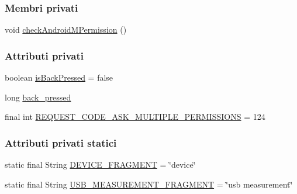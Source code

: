 \subsubsection*{Membri privati}
\begin{DoxyCompactItemize}
\item 
void \hyperlink{classit_1_1unibo_1_1torsello_1_1bluetoothpositioning_1_1activities_1_1MainActivity_ab762aac3d11f5b0ccc6042a140804d5d_ab762aac3d11f5b0ccc6042a140804d5d}{check\+Android\+M\+Permission} ()
\end{DoxyCompactItemize}
\subsubsection*{Attributi privati}
\begin{DoxyCompactItemize}
\item 
boolean \hyperlink{classit_1_1unibo_1_1torsello_1_1bluetoothpositioning_1_1activities_1_1MainActivity_a73d74411ec7bb55eb827bb81018174bd_a73d74411ec7bb55eb827bb81018174bd}{is\+Back\+Pressed} = false
\item 
long \hyperlink{classit_1_1unibo_1_1torsello_1_1bluetoothpositioning_1_1activities_1_1MainActivity_a5e1ae38b2bbdcc45f2164fdc393ca495_a5e1ae38b2bbdcc45f2164fdc393ca495}{back\+\_\+pressed}
\item 
final int \hyperlink{classit_1_1unibo_1_1torsello_1_1bluetoothpositioning_1_1activities_1_1MainActivity_a319aed5cdd5724e043302babe5fcfeac_a319aed5cdd5724e043302babe5fcfeac}{R\+E\+Q\+U\+E\+S\+T\+\_\+\+C\+O\+D\+E\+\_\+\+A\+S\+K\+\_\+\+M\+U\+L\+T\+I\+P\+L\+E\+\_\+\+P\+E\+R\+M\+I\+S\+S\+I\+O\+NS} = 124
\end{DoxyCompactItemize}
\subsubsection*{Attributi privati statici}
\begin{DoxyCompactItemize}
\item 
static final String \hyperlink{classit_1_1unibo_1_1torsello_1_1bluetoothpositioning_1_1activities_1_1MainActivity_a2f77c0245ac2525dc58905e38e1817d1_a2f77c0245ac2525dc58905e38e1817d1}{D\+E\+V\+I\+C\+E\+\_\+\+F\+R\+A\+G\+M\+E\+NT} = \char`\"{}device\char`\"{}
\item 
static final String \hyperlink{classit_1_1unibo_1_1torsello_1_1bluetoothpositioning_1_1activities_1_1MainActivity_a64bac06e6db556ba1e36c8773e61137b_a64bac06e6db556ba1e36c8773e61137b}{U\+S\+B\+\_\+\+M\+E\+A\+S\+U\+R\+E\+M\+E\+N\+T\+\_\+\+F\+R\+A\+G\+M\+E\+NT} = \char`\"{}usb measurement\char`\"{}
\end{DoxyCompactItemize}


